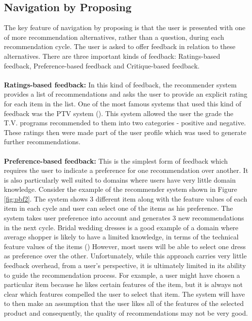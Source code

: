 \subsection{Navigation by Proposing}

The key feature of navigation by proposing is that the user is presented with one of more recommendation alternatives, rather than a question, during each recommendation cycle. 
The user is asked to offer feedback in relation to these alternatives.
There are three important kinds of feedback: Ratings-based feedback, Preference-based feedback and Critique-based feedback.\\
\\
\textbf{Ratings-based feedback:} In this kind of feedback, the recommender system provides a list of recommendations and  asks the user to provide an explicit rating for each item in the list.
One of the most famous systems that used this kind of feedback was the PTV system (\cite{smyth99tv}).
This system allowed the user the grade the T.V. programs recommended to them into two categories - positive and negative. 
These ratings then were made part of the user profile which was used to generate further recommendations.\\
\\
\textbf{Preference-based feedback:} This is the simplest form of feedback which requires the user to indicate a preference for one recommendation over another. 
It is also particularly well suited to domains where users have very little domain knowledge.
Consider the example of the recommender system shown in Figure \ref{fig:pbf2}. 
The system shows 3 different item along with the feature values of each item in each cycle and user can select one of the items as his preference.
The system takes user preference into account and generates 3 new recommendations in the next cycle.
Bridal wedding dresses is a good example of a domain where average shopper is likely to have a limited knowledge, in terms of the technical feature values of the items (\cite{smyth2007})
However, most users will be able to select one dress as preference over the other.
Unfortunately, while this approach carries very little feedback overhead, from a user’s perspective, it is ultimately limited in its ability to guide the recommendation process.
For example, a user might have chosen a particular item because he likes certain features of the item, but it is always not clear which features compelled the user to select that item.
The system will have to then make an assumption that the user likes all of the features of the selected product and consequently, the quality of recommendations may not be very good.

